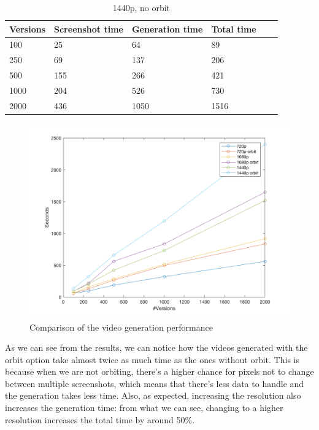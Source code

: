 \documentclass[]{usiinfbachelorproject}
\begin{document}
\begin{table}[H]
    \begin{center}
        \begin{tabular}{ | l | l | l | l | l | l |}
        \hline
        Versions & Screenshot time & Generation time & Total time \\ \hline
        100 & 25 & 64 & 89 \\ \hline
        250 & 69 & 137 & 206\\ \hline
        500 & 155 & 266 & 421\\ \hline
        1000 & 204 & 526 & 730\\ \hline
        2000 & 436 & 1050 & 1516\\ \hline
        \end{tabular}
    \end{center}
    \caption{1440p, no orbit}
    \label{tab:performance}
\end{table}

\begin{figure} [H]
\centering
\includegraphics[width=1\textwidth]{pictures/figure1.png}
\caption{Comparison of the video generation performance}
\label{fig:plot}
\end{figure}


As we can see from the results, we can notice how the videos generated with the orbit option take almost twice as much time
as the ones without orbit. This is because when we are not orbiting, there's a higher chance for pixels not to change between multiple screenshots, which means that there's less data to handle and the generation takes less time.
Also, as expected, increasing the resolution also increases the generation time: from what we can see, changing to a higher resolution increases the total time by around 50\%.
\end{document}
